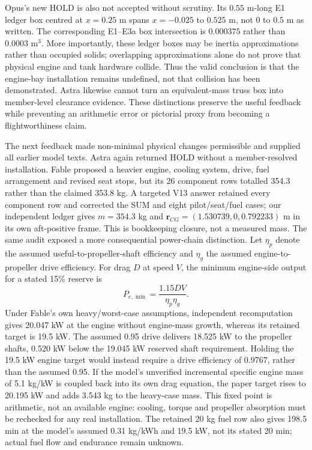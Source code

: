 \documentclass[11pt,a4paper]{article}
\begin{document}
Opus's new HOLD is also not accepted without scrutiny. Its $0.55$ m-long E1 ledger box centred at $x=0.25$ m spans $x=-0.025$ to $0.525$ m, not $0$ to $0.5$ m as written. The corresponding E1--E3a box intersection is $0.000375$ rather than $0.0003$ m$^3$. More importantly, these ledger boxes may be inertia approximations rather than occupied solids; overlapping approximations alone do not prove that physical engine and tank hardware collide. Thus the valid conclusion is that the engine-bay installation remains undefined, not that collision has been demonstrated. Astra likewise cannot turn an equivalent-mass truss box into member-level clearance evidence. These distinctions preserve the useful feedback while preventing an arithmetic error or pictorial proxy from becoming a flightworthiness claim.

The next feedback made non-minimal physical changes permissible and supplied all earlier model texts. Astra again returned HOLD without a member-resolved installation. Fable proposed a heavier engine, cooling system, drive, fuel arrangement and revised seat stops, but its 26 component rows totalled 354.3 rather than the claimed 353.8 kg. A targeted V13 answer retained every component row and corrected the SUM and eight pilot/seat/fuel cases; our independent ledger gives $m=354.3$ kg and $\boldsymbol r_{CG}=(1.530739,0,0.792233)$ m in its own aft-positive frame. This is bookkeeping closure, not a measured mass. The same audit exposed a more consequential power-chain distinction. Let $\eta_p$ denote the assumed useful-to-propeller-shaft efficiency and $\eta_g$ the assumed engine-to-propeller drive efficiency. For drag $D$ at speed $V$, the minimum engine-side output for a stated 15\% reserve is
\begin{equation}\label{eq:drivegate}
P_{e,\min}=\frac{1.15DV}{\eta_p\eta_g}.
\end{equation}
Under Fable's own heavy/worst-case assumptions, independent recomputation gives 20.047 kW at the engine without engine-mass growth, whereas its retained target is 19.5 kW. The assumed 0.95 drive delivers 18.525 kW to the propeller shafts, 0.520 kW below the 19.045 kW reserved shaft requirement. Holding the 19.5 kW engine target would instead require a drive efficiency of 0.9767, rather than the assumed 0.95. If the model's unverified incremental specific engine mass of 5.1 kg/kW is coupled back into its own drag equation, the paper target rises to 20.195 kW and adds 3.543 kg to the heavy-case mass. This fixed point is arithmetic, not an available engine: cooling, torque and propeller absorption must be rechecked for any real installation. The retained 20 kg fuel row also gives 198.5 min at the model's assumed 0.31 kg/kWh and 19.5 kW, not its stated 20 min; actual fuel flow and endurance remain unknown.
\end{document}
